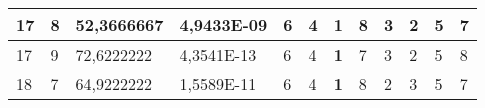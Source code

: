 \documentclass[conference]{IEEEtran}
\begin{document}
\begin{table*}[]
\begin{tabular}{|llll|llllllll|}
\multicolumn{1}{|l|}{17}                                                    & \multicolumn{1}{l|}{8}                                                        & \multicolumn{1}{l|}{52,3666667}                                                   & 4,9433E-09                     & \multicolumn{1}{l|}{6}                                                  & \multicolumn{1}{l|}{4}                                                  & \multicolumn{1}{l|}{\textbf{1}}                                         & \multicolumn{1}{l|}{8}                                                  & \multicolumn{1}{l|}{3}                                                  & \multicolumn{1}{l|}{2}                                                  & \multicolumn{1}{l|}{5}                                                  & 7                          \\ \hline
\multicolumn{1}{|l|}{17}                                                    & \multicolumn{1}{l|}{9}                                                        & \multicolumn{1}{l|}{72,6222222}                                                   & 4,3541E-13                     & \multicolumn{1}{l|}{6}                                                  & \multicolumn{1}{l|}{4}                                                  & \multicolumn{1}{l|}{\textbf{1}}                                         & \multicolumn{1}{l|}{7}                                                  & \multicolumn{1}{l|}{3}                                                  & \multicolumn{1}{l|}{2}                                                  & \multicolumn{1}{l|}{5}                                                  & 8                          \\ \hline
\multicolumn{1}{|l|}{18}                                                    & \multicolumn{1}{l|}{7}                                                        & \multicolumn{1}{l|}{64,9222222}                                                   & 1,5589E-11                     & \multicolumn{1}{l|}{6}                                                  & \multicolumn{1}{l|}{4}                                                  & \multicolumn{1}{l|}{\textbf{1}}                                         & \multicolumn{1}{l|}{8}                                                  & \multicolumn{1}{l|}{2}                                                  & \multicolumn{1}{l|}{3}                                                  & \multicolumn{1}{l|}{5}                                                  & 7                          \\ \hline

\end{tabular}
\end{table*}
\end{document}
